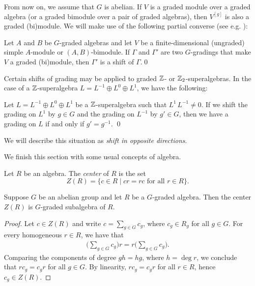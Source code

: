 From now on, we assume that $G$ is abelian.
If $V$ is a graded module over a graded algebra (or a graded bimodule over a pair of graded algebras), then $V^{[g]}$ is also a graded (bi)module.
We will make use of the following partial converse (see e.g. \cite[Proposition 3.5]{paper-Qn}):

\begin{lemma}\label{lemma:simplebimodule}
	Let $A$ and $B$ be $G$-graded algebras and let $V$ be a finite-dimensional (ungraded) simple $A$-module or $(A,B)$-bimodule.  If $\Gamma$ and $\Gamma'$ are  two $G$-gradings that make $V$ a graded (bi)module, then $\Gamma'$ is a  shift of $\Gamma$.\qed
\end{lemma}

Certain shifts of grading may be applied to graded $\mathbb{Z}$- or $\mathbb{Z}_2$-superalgebras. In the case of a $\mathbb{Z}$-superalgebra $L=L^{-1}\oplus L^{0}\oplus L^{1}$, we have the following:

\begin{lemma}\label{lemma:opposite-directions}
	Let $L=L^{-1}\oplus L^0\oplus L^1$ be a $\mathbb{Z}$-superalgebra such that $L^1\, L^{-1}\neq 0$. If we shift the grading on $L^1$ by $g\in G$ and the grading on $L^{-1}$ by $g' \in G$, then we have a grading on $L$ if and only if $g' = g^{-1}$. \qed
\end{lemma}

We will describe this situation as \emph{shift in opposite directions}.

We finish this section with some usual concepts of algebra.

\begin{defi}\label{defi:center}
	Let $R$ be an algebra.
	The \emph{center} of $R$ is the set
	\[
		Z(R) = \{c\in R \mid cr = rc \text{ for all } r\in R \}.
	\]
\end{defi}

\begin{lemma}\label{lemma:center-is-graded}
	Suppose $G$ be an abelian group and let $R$ be a $G$-graded algebra.
	Then the center $Z(R)$ is $G$-graded subalgebra of $R$.
\end{lemma}

\begin{proof}
	Let $c \in Z(R)$ and write $c = \sum_{g \in G} c_g$, where $c_g \in R_g$ for all $g \in G$.
	For every homogeneous $r \in R$, we have that
	\begin{align*}
		\big(\sum_{g\in G} c_g\big)r = r \big(\sum_{g\in G} c_g\big).
	\end{align*}
	Comparing the components of degree $gh = hg$, where $h = \deg r$, we conclude that $rc_g = c_g r$ for all $g \in G$.
	By linearity, $r c_g = c_g r$ for all $r\in R$, hence $c_g \in Z(R)$.
\end{proof}

